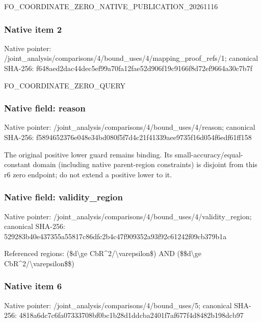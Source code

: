 \documentclass[10pt,a4paper]{article}
\begin{document}
\begingroup\raggedright\sloppy FO\_\allowbreak{}COORDINATE\_\allowbreak{}ZERO\_\allowbreak{}NATIVE\_\allowbreak{}PUBLICATION\_\allowbreak{}20261116\par\endgroup

\subsubsection{Native item 2}
Native pointer: /joint\_\allowbreak{}analysis/comparisons/4/bound\_\allowbreak{}uses/4/mapping\_\allowbreak{}proof\_\allowbreak{}refs/1; canonical SHA-256: f648aed2dac44dec5ef99a70fa12fae52d906f19c9166f8d72ef9664a30c7b7f

\begingroup\raggedright\sloppy FO\_\allowbreak{}COORDINATE\_\allowbreak{}ZERO\_\allowbreak{}QUERY\par\endgroup

\subsubsection{Native field: reason}
Native pointer: /joint\_\allowbreak{}analysis/comparisons/4/bound\_\allowbreak{}uses/4/reason; canonical SHA-256: f5894652376e048e34bd080f5f7d4c21f41339aee9735f16d054f6edf61ff158

\begingroup\raggedright\sloppy The original positive lower guard remains binding. Its small-accuracy/\allowbreak{}equal-constant domain (including native parent-region constraints) is disjoint from this r6 zero endpoint;\allowbreak{} do not extend a positive lower to it.\par\endgroup

\subsubsection{Native field: validity\_\allowbreak{}region}
Native pointer: /joint\_\allowbreak{}analysis/comparisons/4/bound\_\allowbreak{}uses/4/validity\_\allowbreak{}region; canonical SHA-256: 529283b40e437355a55817c86dfc2b4c47f909352a93f92c61242f09cb379b1a

\begingroup\raggedright\sloppy Referenced regions:\allowbreak{} (\$d\textbackslash{}ge CbR\textasciicircum{}2/\allowbreak{}\textbackslash{}varepsilon\$) AND (\$\$d\textbackslash{}ge CbR\textasciicircum{}2/\allowbreak{}\textbackslash{}varepsilon\$\$)\par\endgroup

\subsubsection{Native item 6}
Native pointer: /joint\_\allowbreak{}analysis/comparisons/4/bound\_\allowbreak{}uses/5; canonical SHA-256: 4818a6dc7c6fa07333708bf0bc1b28d1ddcba2401f7af677f4d8482b198dcb97
\end{document}
